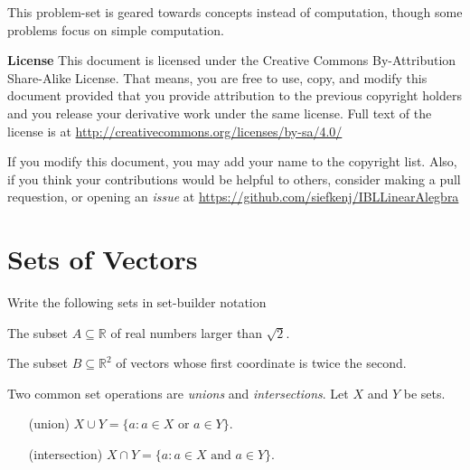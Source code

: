 \documentclass{problemset}
\newcommand{\R}{\mathbb{R}}
\begin{document}
	This problem-set is geared towards concepts instead of computation, though some problems
	focus on simple computation.

	{\bf License}  This document is licensed under the Creative Commons
	By-Attribution Share-Alike License.  That means, you are free to use,
	copy, and modify this document provided that you provide attribution
	to the previous copyright holders and you release your derivative work 
	under the same license.  Full text of the license is at \url{http://creativecommons.org/licenses/by-sa/4.0/}

	If you modify this document, you may add your name to the copyright list.  Also,
	if you think your contributions would be helpful to others, consider making a pull
	requestion, or opening an \emph{issue} at 
	\url{https://github.com/siefkenj/IBLLinearAlegbra}


\newpage

\setcounter{page}{1}
\pagestyle{fancy}
\renewcommand{\headrulewidth}{0pt}

\section*{Sets of Vectors}
	\vspace{-2em}
	\question
		Write the following sets in set-builder notation
	\begin{parts}
			\item The subset $A\subseteq \R$ of real numbers larger than $\sqrt{2}$.
			\item The subset $B\subseteq \R^2$ of vectors whose first coordinate
			is twice the second.
	\end{parts}

	\begin{definition}
		Two common set operations are \emph{unions} and \emph{intersections}.  
		Let $X$ and $Y$ be sets.

		\hfill\begin{minipage}{\dimexpr\textwidth-3cm}
		\begin{itemize}
			\item[(union)] $X\cup Y = \{a:a\in X\text{ or }a\in Y\}$.
			\item[(intersection)] $X\cap Y = \{a: a\in X\text{ and }a\in Y\}$.
		\end{itemize}
		\end{minipage}
	\end{definition}
\end{document}
